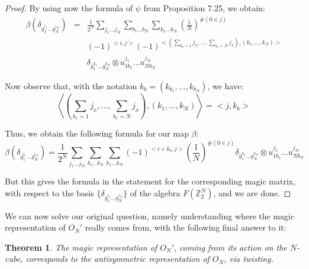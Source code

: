 \documentclass[12pt]{amsbook}
\newtheorem{theorem}{Theorem}[chapter]
\begin{document}
\begin{proof}
By using now the formula of $\psi$ from Proposition 7.25, we obtain:
\begin{eqnarray*}
\beta(\delta_{g_1^{i_1}\ldots g_N^{i_N}})
&=&\frac{1}{2^N}\sum_{j_1\ldots j_N}\sum_{b_1\ldots b_N}\sum_{k_1\ldots k_N}\left(\frac{1}{N}\right)^{\#(0\in j)}\\
&&(-1)^{<i,j>}(-1)^{<(\sum_{b_x=1}j_x,\ldots,\sum_{b_x=N}j_x),(k_1,\ldots,k_N)>}\\
&&\delta_{g_1^{k_1}\ldots g_N^{k_N}}\otimes u_{1b_1}^{j_1}\ldots u_{Nb_N}^{j_N}
\end{eqnarray*}

Now observe that, with the notation $k_b=(k_{b_1},\ldots,k_{b_N})$, we have:
$$\left<\left(\sum_{b_x=1}j_x,\ldots,\sum_{b_x=N}j_x\right),(k_1,\ldots,k_N)\right>=<j,k_b>$$

Thus, we obtain the following formula for our map $\beta$:
$$\beta(\delta_{g_1^{i_1}\ldots g_N^{i_N}})
=\frac{1}{2^N}\sum_{j_1\ldots j_N}\sum_{b_1\ldots b_N}\sum_{k_1\ldots k_N}(-1)^{<i+k_b,j>}\left(\frac{1}{N}\right)^{\#(0\in j)}\delta_{g_1^{k_1}\ldots g_N^{k_N}}\otimes u_{1b_1}^{j_1}\ldots u_{Nb_N}^{j_N}$$

But this gives the formula in the statement for the corresponding magic matrix, with respect to the basis $\{\delta_{g_1^{i_1}\ldots g_N^{i_N}}\}$ of the algebra $F(\mathbb Z_2^N)$, and we are done.
\end{proof}

We can now solve our original question, namely understanding where the magic representation of $O_N'$ really comes from, with the following final answer to it:


\begin{theorem}
The magic representation of $O_N'$, coming from its action on the $N$-cube, corresponds to the antisymmetric representation of $O_N$, via twisting.
\end{theorem}
\end{document}
